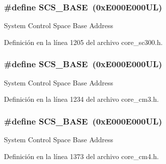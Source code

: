 \subsubsection[{\texorpdfstring{S\+C\+S\+\_\+\+B\+A\+SE}{SCS_BASE}}]{\setlength{\rightskip}{0pt plus 5cm}\#define S\+C\+S\+\_\+\+B\+A\+SE~(0x\+E000\+E000\+U\+L)}\hypertarget{group___c_m_s_i_s__core__base_ga3c14ed93192c8d9143322bbf77ebf770}{}\label{group___c_m_s_i_s__core__base_ga3c14ed93192c8d9143322bbf77ebf770}
System Control Space Base Address 

Definición en la línea 1205 del archivo core\+\_\+sc300.\+h.

\subsubsection[{\texorpdfstring{S\+C\+S\+\_\+\+B\+A\+SE}{SCS_BASE}}]{\setlength{\rightskip}{0pt plus 5cm}\#define S\+C\+S\+\_\+\+B\+A\+SE~(0x\+E000\+E000\+U\+L)}\hypertarget{group___c_m_s_i_s__core__base_ga3c14ed93192c8d9143322bbf77ebf770}{}\label{group___c_m_s_i_s__core__base_ga3c14ed93192c8d9143322bbf77ebf770}
System Control Space Base Address 

Definición en la línea 1234 del archivo core\+\_\+cm3.\+h.

\subsubsection[{\texorpdfstring{S\+C\+S\+\_\+\+B\+A\+SE}{SCS_BASE}}]{\setlength{\rightskip}{0pt plus 5cm}\#define S\+C\+S\+\_\+\+B\+A\+SE~(0x\+E000\+E000\+U\+L)}\hypertarget{group___c_m_s_i_s__core__base_ga3c14ed93192c8d9143322bbf77ebf770}{}\label{group___c_m_s_i_s__core__base_ga3c14ed93192c8d9143322bbf77ebf770}
System Control Space Base Address 

Definición en la línea 1373 del archivo core\+\_\+cm4.\+h.

